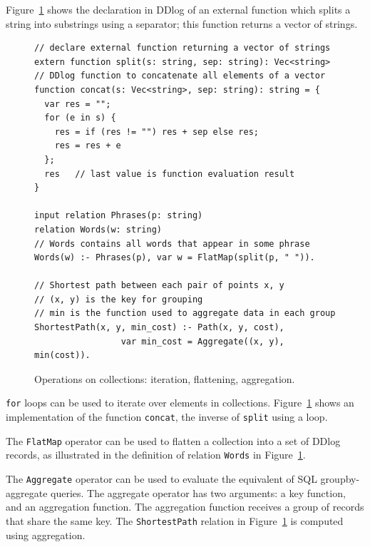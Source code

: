 
Figure~\ref{fig:collections} shows the declaration in DDlog of an
external function which splits a string into substrings using a
separator; this function returns a vector of strings.

\begin{figure}[t]
  \small
  \begin{lstlisting}[language=ddlog]
// declare external function returning a vector of strings
extern function split(s: string, sep: string): Vec<string>
// DDlog function to concatenate all elements of a vector
function concat(s: Vec<string>, sep: string): string = {
  var res = "";
  for (e in s) {
    res = if (res != "") res + sep else res;
    res = res + e
  };
  res   // last value is function evaluation result
}

input relation Phrases(p: string)
relation Words(w: string)
// Words contains all words that appear in some phrase
Words(w) :- Phrases(p), var w = FlatMap(split(p, " ")).

// Shortest path between each pair of points x, y
// (x, y) is the key for grouping
// min is the function used to aggregate data in each group
ShortestPath(x, y, min_cost) :- Path(x, y, cost),
                 var min_cost = Aggregate((x, y), min(cost)).
\end{lstlisting}
\caption{Operations on collections: iteration, flattening,
  aggregation.\label{fig:collections}}
\end{figure}

\texttt{for} loops can be used to iterate over elements in
collections.  Figure~\ref{fig:collections} shows an implementation of
the function \texttt{concat}, the inverse of \texttt{split} using a
loop.

The \texttt{FlatMap} operator can be used to flatten
a collection into a set of DDlog records, as illustrated in the definition of
relation \texttt{Words} in Figure~\ref{fig:collections}.

The \texttt{Aggregate} operator can be used to evaluate the equivalent
of SQL groupby-aggregate queries.  The aggregate operator has two
arguments: a key function, and an aggregation function.  The
aggregation function receives a group of
records that share the same key.  The
\texttt{ShortestPath} relation in Figure~\ref{fig:collections} is
computed using aggregation.

